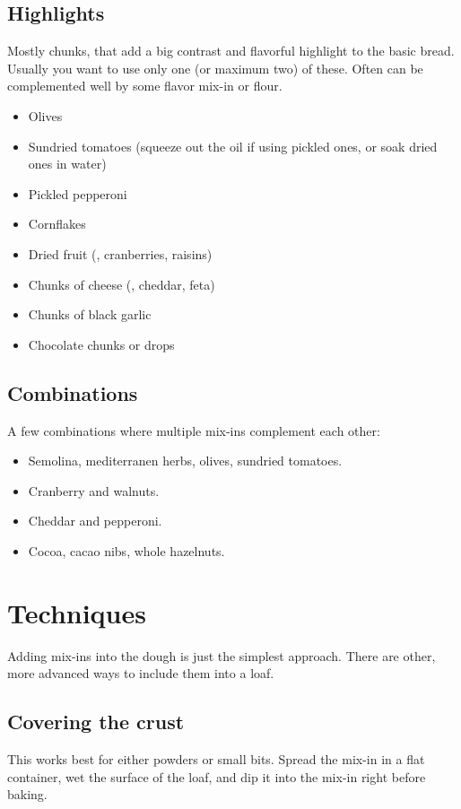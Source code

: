 \subsection{Highlights}
Mostly chunks, that add a big contrast and flavorful highlight to the basic
bread. Usually you want to use only one (or maximum two) of these. Often can
be complemented well by some flavor mix-in or flour.
\begin{itemize}
  \item Olives
  \item Sundried tomatoes (squeeze out the oil if using pickled ones, or soak
      dried ones in water)
  \item Pickled pepperoni
  \item Cornflakes
  \item Dried fruit (\eg, cranberries, raisins)
  \item Chunks of cheese (\eg, cheddar, feta)
  \item Chunks of black garlic
  \item Chocolate chunks or drops
\end{itemize}

\subsection{Combinations}
A few combinations where multiple mix-ins complement each other:
\begin{itemize}
  \item Semolina, mediterranen herbs, olives, sundried tomatoes.
  \item Cranberry and walnuts.
  \item Cheddar and pepperoni.
  \item Cocoa, cacao nibs, whole hazelnuts.
\end{itemize}

\section{Techniques}
Adding mix-ins into the dough is just the simplest approach. There are other,
more advanced ways to include them into a loaf.

\subsection{Covering the crust}
This works best for either powders or small bits. Spread the mix-in in a flat
container, wet the surface of the loaf, and dip it into the mix-in right
before baking.


